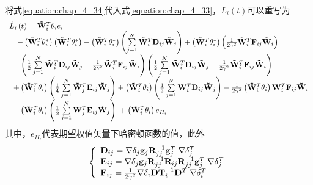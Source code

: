 将式\ref{equation:chap_4_34}代入式\ref{equation:chap_4_33}，${\dot L_i}\left( t \right)$可以重写为
\begin{equation}
  \begin{array}{l}
    {{\dot L}_i}\left( t \right) = {{{\bf{\tilde W}}}_i}^T{{\bf{\theta }}_i}{e_i}\\
     =  - \left( {{\bf{\tilde W}}_i^T{\bf{\theta }}_i^*} \right)\left( {{\bf{\tilde W}}_i^T{\bf{\theta }}_i^*} \right) - \left( {{\bf{\tilde W}}_i^T{\bf{\theta }}_i^*} \right)\left( {\sum\limits_{j = 1}^N {{\bf{\tilde W}}_i^T{{\bf{D}}_{ij}}{{{\bf{\tilde W}}}_j}} } \right) + \left( {{\bf{\tilde W}}_i^T{\bf{\theta }}_i^*} \right)\left( {\frac{1}{{2{\gamma ^2}}}{\bf{\tilde W}}_i^T{{\bf{F}}_{ij}}{{{\bf{\tilde W}}}_i}} \right)\\
    \;\; - \left( {\frac{1}{2}\sum\limits_{j = 1}^N {{\bf{\tilde W}}_i^T{{\bf{D}}_{ij}}{{{\bf{\tilde W}}}_j} - \frac{1}{{2{\gamma ^2}}}{\bf{\tilde W}}_i^T{{\bf{F}}_{ij}}{{{\bf{\tilde W}}}_i}} } \right)\left( {\frac{1}{2}\sum\limits_{j = 1}^N {{\bf{\tilde W}}_i^T{{\bf{D}}_{ij}}{{{\bf{\tilde W}}}_j} - \frac{1}{{2{\gamma ^2}}}{\bf{\tilde W}}_i^T{{\bf{F}}_{ij}}{{{\bf{\tilde W}}}_i}} } \right)\\
    \;\; + \left( {{\bf{\tilde W}}_i^T{{\bf{\theta }}_i}} \right)\left( {\frac{1}{4}\sum\limits_{j = 1}^N {{\bf{\tilde W}}_j^T{{\bf{E}}_{ij}}{{{\bf{\tilde W}}}_j}} } \right) + \left( {{\bf{\tilde W}}_i^T{{\bf{\theta }}_i}} \right)\left( {\frac{1}{2}\sum\limits_{j = 1}^N {{\bf{W}}_i^T{{\bf{D}}_{ij}}{{{\bf{\tilde W}}}_j}} } \right) - \frac{1}{{2{\gamma ^2}}}\left( {{\bf{\tilde W}}_i^T{{\bf{\theta }}_i}} \right){\bf{W}}_i^T{{\bf{F}}_{ij}}{{{\bf{\tilde W}}}_i}\\
    \;\; - \left( {{\bf{\tilde W}}_i^T{{\bf{\theta }}_i}} \right)\left( {\frac{1}{2}\sum\limits_{j = 1}^N {{\bf{W}}_j^T{{\bf{E}}_{ij}}{{{\bf{\tilde W}}}_j}} } \right)\; + \left( {{\bf{\tilde W}}_i^T{{\bf{\theta }}_i}} \right){e_{{H_i}}}
    \end{array}
    \label{equation:chap_4_35}
\end{equation}
其中，${e_{{H_i}}}$代表期望权值矢量下哈密顿函数的值，此外
\begin{equation}
  \left\{ \begin{array}{l}
    {{\bf{D}}_{ij}} = \nabla {{\bf{\delta }}_j}{{\bf{g}}_j}{\bf{R}}_{jj}^{ - 1}{\bf{g}}_j^T\;\nabla {\bf{\delta }}_j^T\\
    {{\bf{E}}_{ij}} = \nabla {{\bf{\delta }}_j}{{\bf{g}}_j}{\bf{R}}_{jj}^{ - 1}{{\bf{R}}_{ij}}{\bf{R}}_{jj}^{ - 1}{\bf{g}}_j^T\;\nabla {\bf{\delta }}_j^T\\
    {{\bf{F}}_{ij}} = \frac{1}{{2{\gamma ^2}}}\nabla {{\bf{\delta }}_i}{\bf{DT}}_i^{ - 1}{{\bf{D}}^T}\;\nabla {\bf{\delta }}_i^T
    \end{array} \right.
\end{equation}

